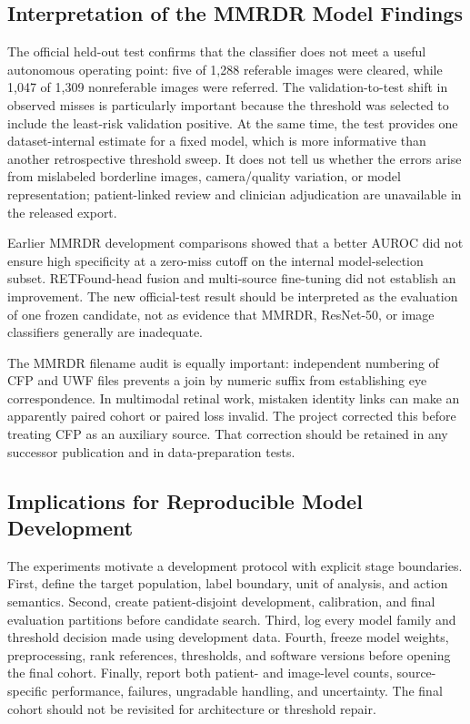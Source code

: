 \documentclass{ieeeaccess}
\begin{document}
\subsection{Interpretation of the MMRDR Model Findings}
The official held-out test confirms that the classifier does not meet a useful autonomous operating point: five of 1,288 referable images were cleared, while 1,047 of 1,309 nonreferable images were referred. The validation-to-test shift in observed misses is particularly important because the threshold was selected to include the least-risk validation positive. At the same time, the test provides one dataset-internal estimate for a fixed model, which is more informative than another retrospective threshold sweep. It does not tell us whether the errors arise from mislabeled borderline images, camera/quality variation, or model representation; patient-linked review and clinician adjudication are unavailable in the released export.

Earlier MMRDR development comparisons showed that a better AUROC did not ensure high specificity at a zero-miss cutoff on the internal model-selection subset. RETFound-head fusion and multi-source fine-tuning did not establish an improvement. The new official-test result should be interpreted as the evaluation of one frozen candidate, not as evidence that MMRDR, ResNet-50, or image classifiers generally are inadequate.

The MMRDR filename audit is equally important: independent numbering of CFP and UWF files prevents a join by numeric suffix from establishing eye correspondence. In multimodal retinal work, mistaken identity links can make an apparently paired cohort or paired loss invalid. The project corrected this before treating CFP as an auxiliary source. That correction should be retained in any successor publication and in data-preparation tests.

\subsection{Implications for Reproducible Model Development}
The experiments motivate a development protocol with explicit stage boundaries. First, define the target population, label boundary, unit of analysis, and action semantics. Second, create patient-disjoint development, calibration, and final evaluation partitions before candidate search. Third, log every model family and threshold decision made using development data. Fourth, freeze model weights, preprocessing, rank references, thresholds, and software versions before opening the final cohort. Finally, report both patient- and image-level counts, source-specific performance, failures, ungradable handling, and uncertainty. The final cohort should not be revisited for architecture or threshold repair.
\end{document}
